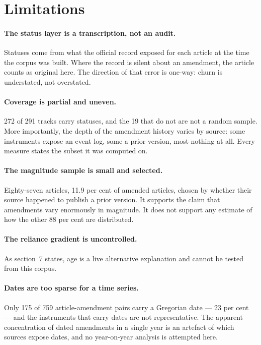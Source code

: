 \documentclass[11pt]{article}
\begin{document}
\section{Limitations}

\paragraph{The status layer is a transcription, not an audit.} Statuses come
from what the official record exposed for each article at the time the corpus
was built. Where the record is silent about an amendment, the article counts
as original here. The direction of that error is one-way: churn is understated,
not overstated.

\paragraph{Coverage is partial and uneven.} 272 of 291 tracks carry statuses,
and the 19 that do not are not a random sample. More importantly, the depth of
the amendment history varies by source: some instruments expose an event log,
some a prior version, most nothing at all. Every measure states the subset it
was computed on.

\paragraph{The magnitude sample is small and selected.} Eighty-seven articles,
11.9 per cent of amended articles, chosen by whether their source happened to
publish a prior version. It supports the claim that amendments vary enormously
in magnitude. It does not support any estimate of how the other 88 per cent are
distributed.

\paragraph{The reliance gradient is uncontrolled.} As section~7
states, age is a live alternative explanation and cannot be tested from this
corpus.

\paragraph{Dates are too sparse for a time series.} Only 175 of 759
article-amendment pairs carry a Gregorian date --- 23 per cent --- and the instruments that carry
dates are not representative. The apparent concentration of dated amendments in
a single year is an artefact of which sources expose dates, and no
year-on-year analysis is attempted here.
\end{document}
